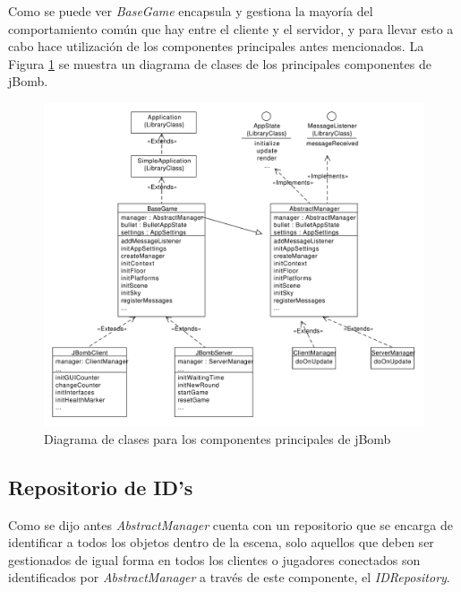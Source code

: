 \documentclass[a4paper,12pt,openany,oneside]{book}
\begin{document}
Como se puede ver \textit{BaseGame} encapsula y gestiona la mayoría del comportamiento común que hay entre el cliente y el servidor, y para llevar esto a cabo hace utilización de los componentes principales antes mencionados. La Figura \ref{diagramlabel} se muestra un diagrama de clases de los principales componentes de jBomb.

\begin{figure}
\begin{center}
\includegraphics[scale=0.5]{diagram.pdf} 
\end{center}
\caption[Diagrama de clases - Componentes principales]{Diagrama de clases para los componentes principales de jBomb}
\label{diagramlabel}
\end{figure}

\subsection{Repositorio de ID's}
Como se dijo antes \textit{AbstractManager} cuenta con un repositorio que se encarga de identificar a todos los objetos dentro de la escena, solo aquellos que deben ser gestionados de igual forma en todos los clientes o jugadores conectados son identificados por \textit{AbstractManager} a través de este componente, el \textit{IDRepository}.
\end{document}
